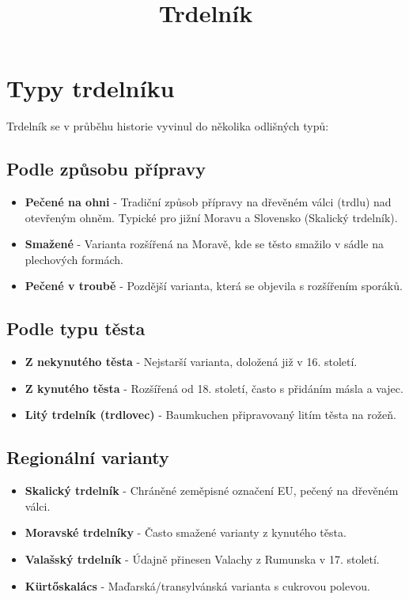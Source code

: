 \documentclass[a5paper,10pt]{book}
\title{Trdelník}
\begin{document}
\frontmatter
\maketitle
\tableofcontents

\mainmatter



\chapter{Typy trdelníku}
Trdelník se v průběhu historie vyvinul do několika odlišných typů:

\section{Podle způsobu přípravy}
\begin{itemize}
\item \textbf{Pečené na ohni} - Tradiční způsob přípravy na dřevěném válci (trdlu) nad otevřeným ohněm. Typické pro jižní Moravu a Slovensko (Skalický trdelník).
\item \textbf{Smažené} - Varianta rozšířená na Moravě, kde se těsto smažilo v sádle na plechových formách.
\item \textbf{Pečené v troubě} - Pozdější varianta, která se objevila s rozšířením sporáků.
\end{itemize}

\section{Podle typu těsta}
\begin{itemize}
\item \textbf{Z nekynutého těsta} - Nejstarší varianta, doložená již v 16. století.
\item \textbf{Z kynutého těsta} - Rozšířená od 18. století, často s přidáním másla a vajec.
\item \textbf{Litý trdelník (trdlovec)} - Baumkuchen připravovaný litím těsta na rožeň.
\end{itemize}

\section{Regionální varianty}
\begin{itemize}
\item \textbf{Skalický trdelník} - Chráněné zeměpisné označení EU, pečený na dřevěném válci.
\item \textbf{Moravské trdelníky} - Často smažené varianty z kynutého těsta.
\item \textbf{Valašský trdelník} - Údajně přinesen Valachy z Rumunska v 17. století.
\item \textbf{Kürtőskalács} - Maďarská/transylvánská varianta s cukrovou polevou.
\end{itemize}
\end{document}
